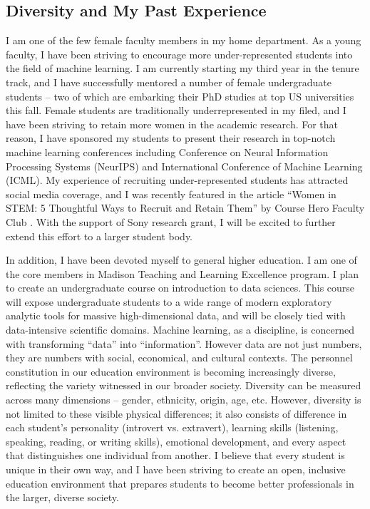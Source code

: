\documentclass[10pt]{article}
\theoremstyle{definition}
\theoremstyle{definition}
\theoremstyle{definition}
\begin{document}
\subsection{Diversity and My Past Experience}
I am one of the few female faculty members in my home department. As a young faculty, I have been striving to encourage more under-represented students into the field of machine learning. I am currently starting my third year in the tenure track, and I have successfully mentored a number of female undergraduate students -- two of which are embarking their PhD studies at top US universities this fall. Female students are traditionally underrepresented in my filed, and I have been striving to retain more women in the academic research. For that reason, I have sponsored my students to present their research in top-notch machine learning conferences including Conference on Neural Information Processing Systems (NeurIPS) and International Conference of Machine Learning (ICML). My experience of recruiting under-represented students has attracted social media coverage, and I was recently featured in the article ``Women in STEM: 5 Thoughtful Ways to Recruit and Retain Them'' by Course Hero Faculty Club . With the support of Sony research grant, I will be excited to further extend this effort to a larger student body. 


In addition, I have been devoted myself to general higher education. I am one of the core members in Madison Teaching and Learning Excellence program. I plan to create an undergraduate course on introduction to data sciences. This course will expose undergraduate students to a wide range of modern exploratory analytic tools for massive high-dimensional data, and will be closely tied with data-intensive scientific domains. Machine learning, as a discipline, is concerned with transforming “data” into “information”. However data are not just numbers, they are numbers with social, economical, and cultural contexts. The personnel constitution in our education environment is becoming increasingly diverse, reflecting the variety witnessed in our broader society. Diversity can be measured across many dimensions – gender, ethnicity, origin, age, etc. However, diversity is not limited to these visible physical differences; it also consists of difference in each student’s personality (introvert vs. extravert), learning skills (listening, speaking, reading, or writing skills), emotional development, and every aspect that distinguishes one individual from another. I believe that every student is unique in their own way, and I have been striving to create an open, inclusive education environment that prepares students to become better professionals in the larger, diverse society.
\end{document}
